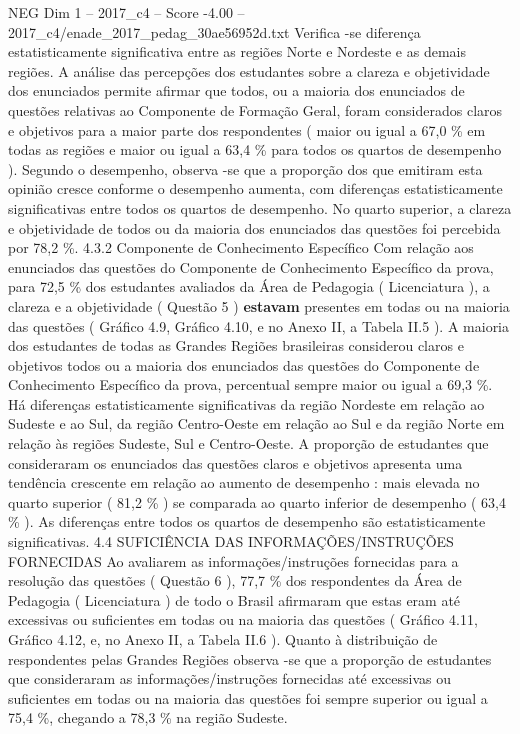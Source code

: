 \begin{textsample}{NEG Dim 1 – 2017\_c4 – Score -4.00 – 2017\_c4/enade\_2017\_pedag\_30ae56952d.txt}
Verifica -se diferença estatisticamente significativa entre as regiões Norte e Nordeste e as demais regiões.
A análise das percepções dos estudantes sobre a clareza e objetividade dos enunciados permite afirmar que todos, ou a maioria dos enunciados de questões relativas ao Componente de Formação Geral, foram considerados claros e objetivos para a maior parte dos respondentes ( maior ou igual a 67,0 \% em todas as regiões e maior ou igual a 63,4 \% para todos os quartos de desempenho ).
Segundo o desempenho, observa -se que a proporção dos que emitiram esta opinião cresce conforme o desempenho aumenta, com diferenças estatisticamente significativas entre todos os quartos de desempenho.
No quarto superior, a clareza e objetividade de todos ou da maioria dos enunciados das questões foi percebida por 78,2 \%. 4.3.2 Componente de Conhecimento Específico Com relação aos enunciados das questões do Componente de Conhecimento Específico da prova, para 72,5 \% dos estudantes avaliados da Área de Pedagogia ( Licenciatura ), a clareza e a objetividade ( Questão 5 ) \textbf{estavam} presentes em todas ou na maioria das questões ( Gráfico 4.9, Gráfico 4.10, e no Anexo II, a Tabela II.5 ).
A maioria dos estudantes de todas as Grandes Regiões brasileiras considerou claros e objetivos todos ou a maioria dos enunciados das questões do Componente de Conhecimento Específico da prova, percentual sempre maior ou igual a 69,3 \%.
Há diferenças estatisticamente significativas da região Nordeste em relação ao Sudeste e ao Sul, da região Centro-Oeste em relação ao Sul e da região Norte em relação às regiões Sudeste, Sul e Centro-Oeste.
A proporção de estudantes que consideraram os enunciados das questões claros e objetivos apresenta uma tendência crescente em relação ao aumento de desempenho : mais elevada no quarto superior ( 81,2 \% ) se comparada ao quarto inferior de desempenho ( 63,4 \% ).
As diferenças entre todos os quartos de desempenho são estatisticamente significativas. 4.4 SUFICIÊNCIA DAS INFORMAÇÕES/INSTRUÇÕES FORNECIDAS Ao avaliarem as informações/instruções fornecidas para a resolução das questões ( Questão 6 ), 77,7 \% dos respondentes da Área de Pedagogia ( Licenciatura ) de todo o Brasil afirmaram que estas eram até excessivas ou suficientes em todas ou na maioria das questões ( Gráfico 4.11, Gráfico 4.12, e, no Anexo II, a Tabela II.6 ).
Quanto à distribuição de respondentes pelas Grandes Regiões observa -se que a proporção de estudantes que consideraram as informações/instruções fornecidas até excessivas ou suficientes em todas ou na maioria das questões foi sempre superior ou igual a 75,4 \%, chegando a 78,3 \% na região Sudeste.

\end{textsample}
